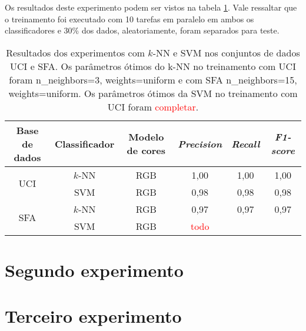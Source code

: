 Os resultados deste experimento podem ser vistos na tabela \ref{tab:resultados_experimento_um}. Vale ressaltar que o treinamento foi executado com 10 tarefas em paralelo em ambos os classificadores e 30\% dos dados, aleatoriamente, foram separados para teste.
\begin{table}[!htpb]
\centering
\begin{small}
\setlength{\tabcolsep}{8pt}

\begin{tabular}{|c|c|c|c|c|c|}\hline
 Base de dados & Classificador & Modelo de cores & \emph{Precision} & \emph{Recall} & \emph{F1-score} \\ \hline
 \multirow{2}{*}{UCI} & $k$-NN & RGB & 1,00 & 1,00 & 1,00 \\ \cline{2-6}
                      & SVM    & RGB & 0,98 & 0,98 & 0,98 \\ \hline
 \multirow{2}{*}{SFA} & $k$-NN & RGB & 0,97 & 0,97 & 0,97 \\ \cline{2-6}
                      & SVM    & RGB & \textcolor{red}{todo} && \\ \hline

\end{tabular}
\end{small}
\caption[Resultados dos experimentos com $k$-NN e SVM nos conjuntos de dados UCI e SFA]{Resultados dos experimentos com $k$-NN e SVM nos conjuntos de dados UCI e SFA. Os parâmetros ótimos do k-NN no treinamento com UCI foram n\_neighbors=3, weights=uniform e com SFA n\_neighbors=15, weights=uniform. Os parâmetros ótimos da SVM no treinamento com UCI foram \textcolor{red}{completar}.}
\label{tab:resultados_experimento_um}
\end{table}


\section{Segundo experimento}


\section{Terceiro experimento}